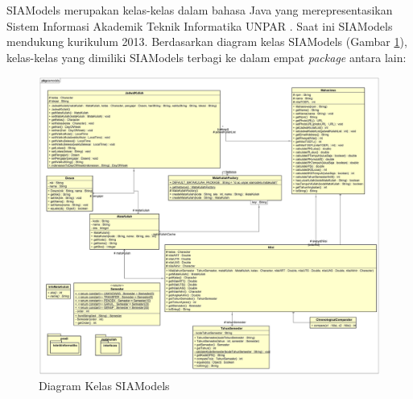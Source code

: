 SIAModels merupakan kelas-kelas dalam bahasa Java yang merepresentasikan Sistem Informasi Akademik Teknik Informatika UNPAR \cite{siamodels}. Saat ini SIAModels mendukung kurikulum 2013. Berdasarkan diagram kelas SIAModels (Gambar \ref{fig:2_siamodels_class}), kelas-kelas yang dimiliki SIAModels terbagi ke dalam empat \textit{package} antara lain:

\begin{figure}[H]
\centering
\includegraphics[scale=0.125]{Gambar/class-diagram-siamodels}
\caption{Diagram Kelas SIAModels}
\label{fig:2_siamodels_class}
\end{figure}


